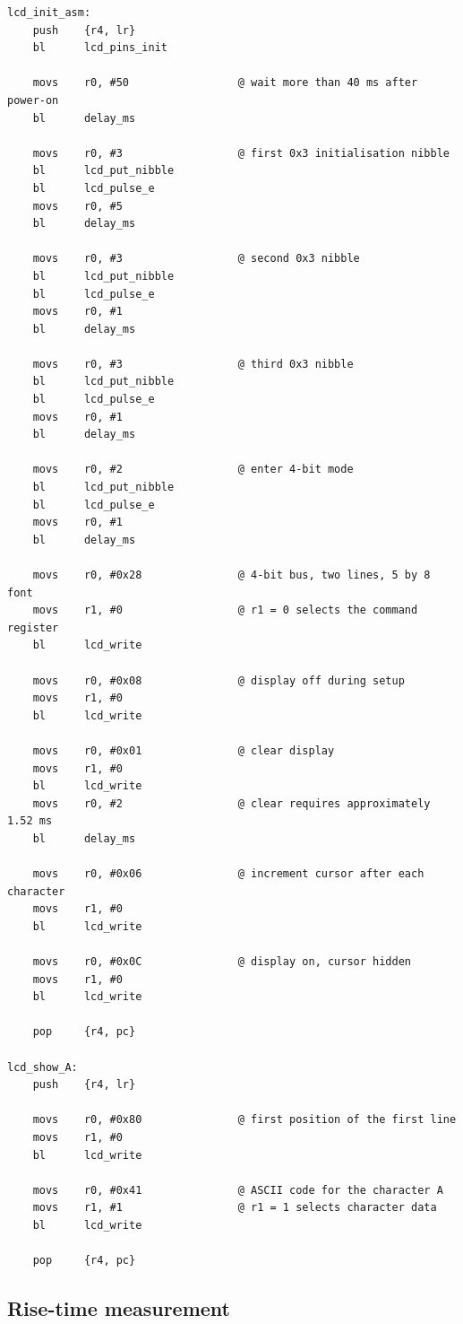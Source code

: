 \documentclass[11pt]{article}
\begin{document}
\begin{lstlisting}
lcd_init_asm:
    push    {r4, lr}
    bl      lcd_pins_init

    movs    r0, #50                 @ wait more than 40 ms after power-on
    bl      delay_ms

    movs    r0, #3                  @ first 0x3 initialisation nibble
    bl      lcd_put_nibble
    bl      lcd_pulse_e
    movs    r0, #5
    bl      delay_ms

    movs    r0, #3                  @ second 0x3 nibble
    bl      lcd_put_nibble
    bl      lcd_pulse_e
    movs    r0, #1
    bl      delay_ms

    movs    r0, #3                  @ third 0x3 nibble
    bl      lcd_put_nibble
    bl      lcd_pulse_e
    movs    r0, #1
    bl      delay_ms

    movs    r0, #2                  @ enter 4-bit mode
    bl      lcd_put_nibble
    bl      lcd_pulse_e
    movs    r0, #1
    bl      delay_ms

    movs    r0, #0x28               @ 4-bit bus, two lines, 5 by 8 font
    movs    r1, #0                  @ r1 = 0 selects the command register
    bl      lcd_write

    movs    r0, #0x08               @ display off during setup
    movs    r1, #0
    bl      lcd_write

    movs    r0, #0x01               @ clear display
    movs    r1, #0
    bl      lcd_write
    movs    r0, #2                  @ clear requires approximately 1.52 ms
    bl      delay_ms

    movs    r0, #0x06               @ increment cursor after each character
    movs    r1, #0
    bl      lcd_write

    movs    r0, #0x0C               @ display on, cursor hidden
    movs    r1, #0
    bl      lcd_write

    pop     {r4, pc}

lcd_show_A:
    push    {r4, lr}

    movs    r0, #0x80               @ first position of the first line
    movs    r1, #0
    bl      lcd_write

    movs    r0, #0x41               @ ASCII code for the character A
    movs    r1, #1                  @ r1 = 1 selects character data
    bl      lcd_write

    pop     {r4, pc}
\end{lstlisting}

\subsection{Rise-time measurement}
\end{document}
